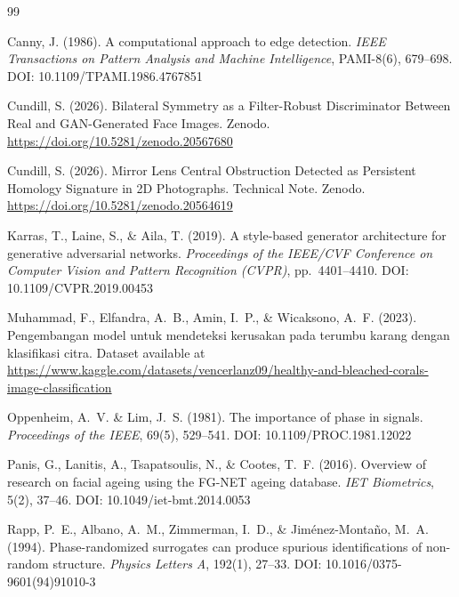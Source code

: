 \documentclass[a4paper,12pt]{article}
\begin{document}
\begin{thebibliography}{99}

Canny, J. (1986).
\newblock A computational approach to edge detection.
\newblock \textit{IEEE Transactions on Pattern Analysis and Machine
Intelligence}, PAMI-8(6), 679--698.
\newblock DOI: 10.1109/TPAMI.1986.4767851

Cundill, S. (2026).
\newblock Bilateral Symmetry as a Filter-Robust Discriminator Between Real and
GAN-Generated Face Images.
\newblock Zenodo. \url{https://doi.org/10.5281/zenodo.20567680}

Cundill, S. (2026).
\newblock Mirror Lens Central Obstruction Detected as Persistent Homology
Signature in 2D Photographs.
\newblock Technical Note. Zenodo. \url{https://doi.org/10.5281/zenodo.20564619}

Karras, T., Laine, S., \& Aila, T. (2019).
\newblock A style-based generator architecture for generative adversarial
networks.
\newblock \textit{Proceedings of the IEEE/CVF Conference on Computer Vision and
Pattern Recognition (CVPR)}, pp.\ 4401--4410.
\newblock DOI: 10.1109/CVPR.2019.00453

Muhammad, F., Elfandra, A.~B., Amin, I.~P., \& Wicaksono, A.~F. (2023).
\newblock Pengembangan model untuk mendeteksi kerusakan pada terumbu karang
dengan klasifikasi citra.
\newblock Dataset available at
\url{https://www.kaggle.com/datasets/vencerlanz09/healthy-and-bleached-corals-image-classification}

Oppenheim, A.~V. \& Lim, J.~S. (1981).
\newblock The importance of phase in signals.
\newblock \textit{Proceedings of the IEEE}, 69(5), 529--541.
\newblock DOI: 10.1109/PROC.1981.12022

Panis, G., Lanitis, A., Tsapatsoulis, N., \& Cootes, T.~F. (2016).
\newblock Overview of research on facial ageing using the {FG-NET} ageing
database.
\newblock \textit{IET Biometrics}, 5(2), 37--46.
\newblock DOI: 10.1049/iet-bmt.2014.0053

Rapp, P.~E., Albano, A.~M., Zimmerman, I.~D., \& Jim\'enez-Monta\~no, M.~A.
(1994).
\newblock Phase-randomized surrogates can produce spurious identifications of
non-random structure.
\newblock \textit{Physics Letters A}, 192(1), 27--33.
\newblock DOI: 10.1016/0375-9601(94)91010-3


\end{thebibliography}
\end{document}
